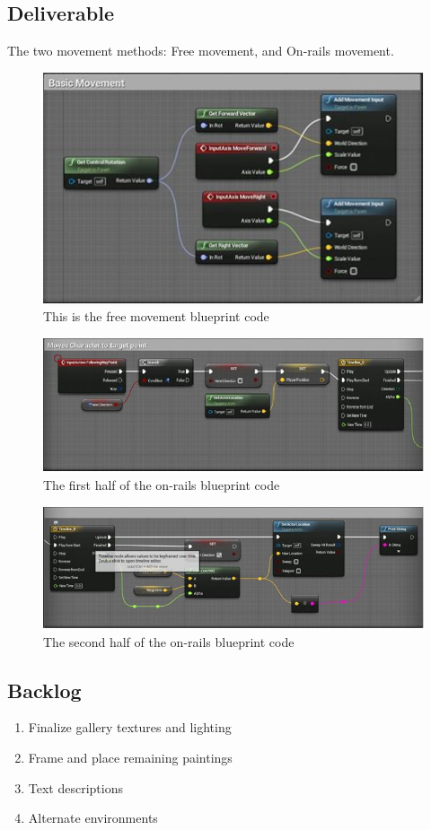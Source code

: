 \subsection{Deliverable}
The two movement methods: Free movement, and On-rails movement.
\begin{figure}
	\caption{This is the free movement blueprint code}
	\centering
	\includegraphics[scale=1.0]{SprintReports/Sprint2/basicMovement.png}
\end{figure}
\begin{figure}
	\caption{The first half of the on-rails blueprint code}
	\centering
	\includegraphics[scale=1.0]{SprintReports/Sprint2/moveToPoint.png}
\end{figure}
\begin{figure}
	\caption{The second half of the on-rails blueprint code}
	\centering
	\includegraphics[scale=1.0]{SprintReports/Sprint2/moveToPoint2.png}
\end{figure}
\subsection{Backlog}
	\begin{enumerate}
	\item Finalize gallery textures and lighting
	\item Frame and place remaining paintings
	\item Text descriptions
	\item Alternate environments
	\end{enumerate}
